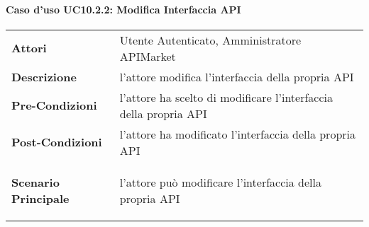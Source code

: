 \paragraph{Caso d'uso UC10.2.2: Modifica Interfaccia API}
\label{UC10.2.2}

\renewcommand*{\arraystretch}{1.6}
\begin{longtable}{ l | p{11cm}}
	\hline
	\rowcolor{Gray}
	\multicolumn{2}{c}{UC10.2.2: Modifica Interfaccia API} \\
	\hline
	\textbf{Attori} &Utente Autenticato, Amministratore APIMarket \\
	\textbf{Descrizione} &  l'attore modifica l'interfaccia della propria API\\
	\textbf{Pre-Condizioni} & l'attore ha scelto di modificare l'interfaccia della propria API\\
	\textbf{Post-Condizioni}& l'attore ha modificato l'interfaccia della propria API\\
	\textbf{Scenario Principale} & \begin{enumerate*}[label=(\arabic*.),itemjoin={\newline}]
		\item l'attore può modificare l'interfaccia della propria API
	\end{enumerate*}\\
\end{longtable}


